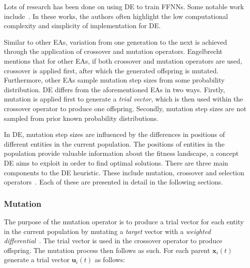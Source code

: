 {Lots of research has been done on using \acs{DE} to train \acp{FFNN}. Some notable work include~\cite{ref:ilonen:2003, ref:slowik:2008, ref:mingguang:2009}. In these works, the authors often highlight the low computational complexity and simplicity of implementation for \acs{DE}.

Similar to other \acp{EA}, variation from one generation to the next is achieved through the application of crossover and mutation operators. Engelbrecht~\cite{ref:engelbrecht:2007} mentions that for other \acp{EA}, if both crossover and mutation operators are used, crossover is applied first, after which the generated offspring is mutated. Furthermore, other \acp{EA} sample mutation step sizes from some probability distribution. \acs{DE} differs from the aforementioned \acp{EA} in two ways. Firstly, mutation is applied first to generate a \textit{trial vector}, which is then used within the crossover operator to produce one offspring. Secondly, mutation step sizes are not sampled from prior known probability distributions.

In \acs{DE}, mutation step sizes are influenced by the differences in positions of different entities in the current population. The positions of entities in the population provide valuable information about the fitness landscape, a concept \acs{DE} aims to exploit in order to find optimal solutions. There are three main components to the \acs{DE} heuristic. These include mutation, crossover and selection operators~\cite{ref:price:2006}. Each of these are presented in detail in the following sections.

\subsubsection{Mutation}\label{sec:heuristics:mh:de:mutation}

The purpose of the mutation operator is to produce a trial vector for each entity in the current population by mutating a \textit{target} vector with a \textit{weighted differential}~\cite{ref:engelbrecht:2007}. The trial vector is used in the crossover operator to produce offspring. The mutation process then follows as such. For each parent $\boldsymbol{x}_{i}(t)$ generate a trial vector $\boldsymbol{u}_{i}(t)$ as follows:

}
